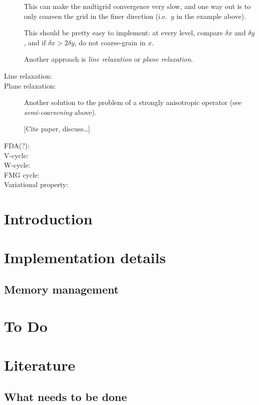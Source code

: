 \documentclass[\mydriver,12pt,twoside,notitlepage,letterpaper]{article}
\begin{document}
\begin{description}
  This can make the multigrid convergence very slow, and one way out is to
  only coarsen the grid in the finer direction (i.e.~$y$ in the example
  above).

  This should be pretty easy to implement: at every level, compare $\delta
  x$ and $\delta y$, and if $\delta x > 2\delta y$, do not coarse-grain in
  $x$.

  Another approach is \emph{line relaxation} or \emph{plane relaxation}.
  
\item[Line relaxation:]
\item[Plane relaxation:]
  Another solution to the problem of a strongly anisotropic operator (see
  \emph{semi-coarsening} above).

  [Cite paper, discuss\ldots]

\item[FDA(?):]
\item[V-cycle:]
\item[W-cycle:]
\item[FMG cycle:]
\item[Variational property:]
\end{description}


\section{Introduction}


\section{Implementation details}


\subsection{Memory management}


\section{To Do}


\section{Literature}


\subsection{What needs to be done}
\end{document}
